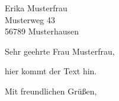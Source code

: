 \documentclass[%
  fontsize=12pt, %
  version=last%
]{scrlttr2}
\begin{document}
\begin{letter}{%
  Erika Musterfrau\\
  Musterweg 43\\
  56789 Musterhausen%
}




\opening{Sehr geehrte Frau Musterfrau,}

hier kommt der Text hin.

\closing{Mit freundlichen Grüßen,}






\end{letter}
\end{document}
